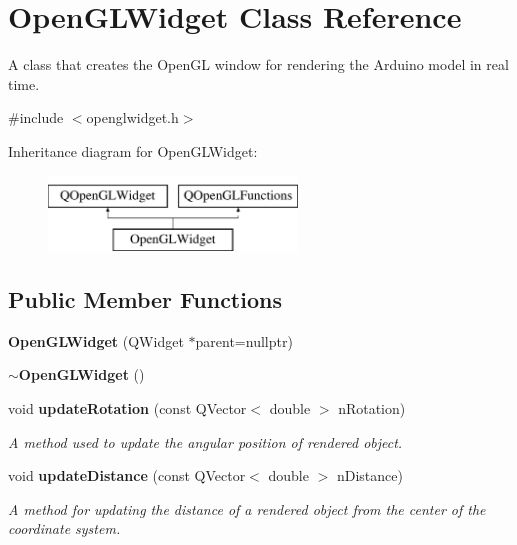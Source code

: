 \section{Open\+G\+L\+Widget Class Reference}
\label{class_open_g_l_widget}


A class that creates the Open\+GL window for rendering the Arduino model in real time.  




{\ttfamily \#include $<$openglwidget.\+h$>$}

Inheritance diagram for Open\+G\+L\+Widget\+:\begin{figure}[H]
\begin{center}
\leavevmode
\includegraphics[height=2.000000cm]{class_open_g_l_widget}
\end{center}
\end{figure}
\subsection*{Public Member Functions}
\begin{DoxyCompactItemize}
\item 
\textbf{ Open\+G\+L\+Widget} (Q\+Widget $\ast$parent=nullptr)
\item 
\textbf{ $\sim$\+Open\+G\+L\+Widget} ()
\item 
void \textbf{ update\+Rotation} (const Q\+Vector$<$ double $>$ n\+Rotation)
\begin{DoxyCompactList}\small\item\em A method used to update the angular position of rendered object. \end{DoxyCompactList}\item 
void \textbf{ update\+Distance} (const Q\+Vector$<$ double $>$ n\+Distance)
\begin{DoxyCompactList}\small\item\em A method for updating the distance of a rendered object from the center of the coordinate system. \end{DoxyCompactList}\end{DoxyCompactItemize}

